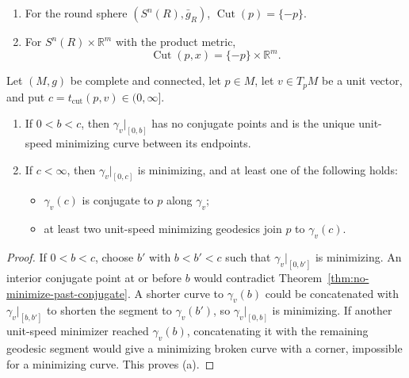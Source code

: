 \begin{example}
\label{ex:cut-loci}
\begin{enumerate}
\item[(a)] For the round sphere $(S^n(R),\bar g_R)$,
$\operatorname{Cut}(p)=\{-p\}$.
\item[(b)] For $S^n(R)\times\mathbb R^m$ with the product metric,
\[
\operatorname{Cut}(p,x)=\{-p\}\times\mathbb R^m.
\]
\end{enumerate}
\end{example}

\begin{proposition}
\label{prop:properties-of-cut-times}

Let $(M,g)$ be complete and connected, let $p\in M$, let
$v\in T_pM$ be a unit vector, and put
$c=t_{\mathrm{cut}}(p,v)\in(0,\infty]$.
\begin{enumerate}
\item[(a)] If $0<b<c$, then $\gamma_v|_{[0,b]}$ has no conjugate points and
is the unique unit-speed minimizing curve between its endpoints.
\item[(b)] If $c<\infty$, then $\gamma_v|_{[0,c]}$ is minimizing, and at
least one of the following holds:
\begin{itemize}
\item $\gamma_v(c)$ is conjugate to $p$ along $\gamma_v$;
\item at least two unit-speed minimizing geodesics join $p$ to $\gamma_v(c)$.
\end{itemize}
\end{enumerate}

\begin{proof}
\sketch If $0<b<c$, choose $b'$ with $b<b'<c$ such that
$\gamma_v|_{[0,b']}$ is minimizing. An interior conjugate point at or before
$b$ would contradict
Theorem~\ref{thm:no-minimize-past-conjugate}. A shorter curve to
$\gamma_v(b)$ could be concatenated with $\gamma_v|_{[b,b']}$ to shorten the
segment to $\gamma_v(b')$, so $\gamma_v|_{[0,b]}$ is minimizing. If another
unit-speed minimizer reached $\gamma_v(b)$, concatenating it with the remaining
geodesic segment would give a minimizing broken curve with a corner, impossible
for a minimizing curve. This proves (a).


\end{proof}
\end{proposition}

